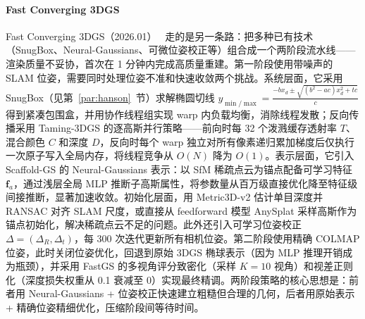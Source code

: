 \paragraph{Fast Converging 3DGS}
Fast Converging 3DGS（2026.01）~\cite{2601_19489} 走的是另一条路：把多种已有技术（SnugBox、Neural-Gaussians、可微位姿校正等）组合成一个两阶段流水线——渲染质量不妥协，首次在 1 分钟内完成高质量重建。第一阶段使用带噪声的 SLAM 位姿，需要同时处理位姿不准和快速收敛两个挑战。系统层面，它采用 SnugBox（见第~\ref{par:hanson}~节）求解椭圆切线 $y_{\min/\max} = \frac{-b x_d \pm \sqrt{(b^2{-}ac)x_d^2 + tc}}{c}$ 得到紧凑包围盒，并用协作线程组实现 warp 内负载均衡，消除线程发散；反向传播采用 Taming-3DGS 的逐高斯并行策略——前向时每 32 个泼溅缓存透射率 $T$、混合颜色 $C$ 和深度 $D$，反向时每个 warp 独立对所有像素递归累加梯度后仅执行一次原子写入全局内存，将线程竞争从 $O(N)$ 降为 $O(1)$。表示层面，它引入 Scaffold-GS 的 Neural-Gaussians 表示：以 SfM 稀疏点云为锚点配备可学习特征 $\mathbf{f}_a$，通过浅层全局 MLP 推断子高斯属性，将参数量从百万级直接优化降至特征级间接推断，显著加速收敛。初始化层面，用 Metric3D-v2 估计单目深度并 RANSAC 对齐 SLAM 尺度，或直接从 feedforward 模型 AnySplat 采样高斯作为锚点初始化，解决稀疏点云不足的问题。此外还引入可学习位姿校正 $\Delta = (\Delta_R, \Delta_t)$，每 300 次迭代更新所有相机位姿。第二阶段使用精确 COLMAP 位姿，此时关闭位姿优化，回退到原始 3DGS 椭球表示（因为 MLP 推理开销成为瓶颈），并采用 FastGS 的多视角评分致密化（采样 $K{=}10$ 视角）和视差正则化（深度损失权重从 0.1 衰减至 0）实现最终精调。两阶段策略的核心思想是：前者用 Neural-Gaussians + 位姿校正快速建立粗糙但合理的几何，后者用原始表示 + 精确位姿精细优化，压缩阶段间等待时间。

